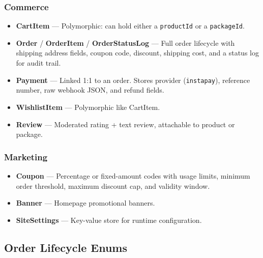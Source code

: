 \documentclass[12pt, a4paper]{article}
\begin{document}
\subsubsection{Commerce}
\begin{itemize}[leftmargin=*]
  \item \textbf{CartItem} — Polymorphic: can hold either a \texttt{productId} or a \texttt{packageId}.
  \item \textbf{Order} / \textbf{OrderItem} / \textbf{OrderStatusLog} — Full order lifecycle with shipping address fields, coupon code, discount, shipping cost, and a status log for audit trail.
  \item \textbf{Payment} — Linked 1:1 to an order. Stores provider (\texttt{instapay}), reference number, raw webhook JSON, and refund fields.
  \item \textbf{WishlistItem} — Polymorphic like CartItem.
  \item \textbf{Review} — Moderated rating + text review, attachable to product or package.
\end{itemize}

\subsubsection{Marketing}
\begin{itemize}[leftmargin=*]
  \item \textbf{Coupon} — Percentage or fixed-amount codes with usage limits, minimum order threshold, maximum discount cap, and validity window.
  \item \textbf{Banner} — Homepage promotional banners.
  \item \textbf{SiteSettings} — Key-value store for runtime configuration.
\end{itemize}

\subsection{Order Lifecycle Enums}
\end{document}
